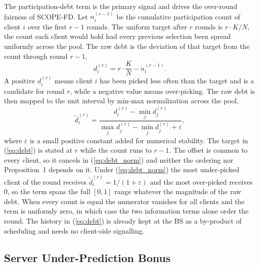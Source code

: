 \documentclass[journal]{IEEEtran}
\newcommand{\rev}[1]{#1}
\begin{document}
The participation-debt term is the primary signal and drives the over-round fairness of SCOPE-FD. Let $n_i^{(r-1)}$ be the cumulative participation count of client $i$ over the first $r-1$ rounds. The uniform target after $r$ rounds is $r\cdot K/N$, the count each client would hold had every previous selection been spread uniformly across the pool. The raw debt is the deviation of that target from the count through round $r-1$,
\begin{equation}
d_i^{(r)} = r\cdot \frac{K}{N} - n_i^{(r-1)}.
\label{eq:debt}
\end{equation}
A positive $d_i^{(r)}$ means client $i$ has been picked less often than the target and is a candidate for round $r$, while a negative value means over-picking. The raw debt is then mapped to the unit interval by min-max normalization across the pool,
\begin{equation}
\tilde{d}_i^{(r)} = \frac{d_i^{(r)} - \min_j d_j^{(r)}}{\max_j d_j^{(r)} - \min_j d_j^{(r)} + \varepsilon},
\label{eq:debt_norm}
\end{equation}
where $\varepsilon$ is a small positive constant added for numerical stability. \rev{The target in (\ref{eq:debt}) is stated at $r$ while the count runs to $r-1$. The offset is common to every client, so it cancels in (\ref{eq:debt_norm}) and neither the ordering nor Proposition~1 depends on it.} Under (\ref{eq:debt_norm}) the most under-picked client of the round receives $\tilde{d}_i^{(r)} = 1/(1+\varepsilon)$ and the most over-picked receives $0$, so the term spans the full $[0,1]$ range whatever the magnitude of the raw debt. \rev{When every count is equal the numerator vanishes for all clients and the term is uniformly zero, in which case the two information terms alone order the round.} The history in (\ref{eq:debt}) is already kept at the BS as a by-product of scheduling and needs no client-side signalling.

\subsection{Server Under-Prediction Bonus}
\label{ssec:bonus-term}
\end{document}
